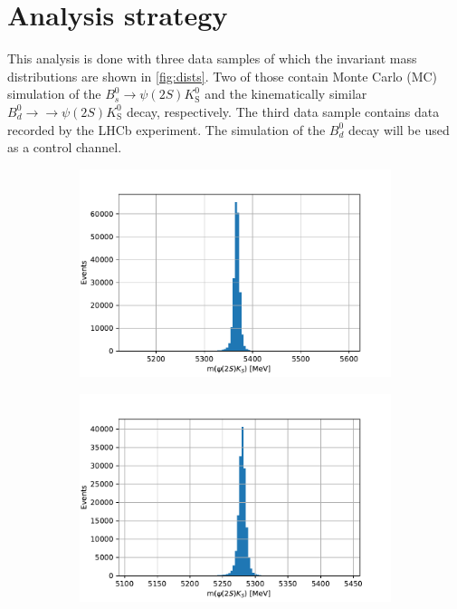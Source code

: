 \section{Analysis strategy}
\label{sec:Durchführung}
This analysis is done with three data samples of which the invariant mass distributions are shown in \autoref{fig:dists}. Two of those contain Monte Carlo (MC) simulation of the $B^0_s \to \psi(2S)K^0_\mathrm{S}$ and the kinematically similar $B^0_d \to \to \psi(2S)K^0_\mathrm{S}$ decay, respectively. The third data sample contains data recorded by the LHCb experiment. The simulation of the $B^0_d$ decay will be used as a control channel.

\begin{figure}[tb]
  \centering
  \begin{subfigure}{.32\textwidth}
    \includegraphics[width=\linewidth]{plots/sim_hist.pdf}
  \end{subfigure}
  \begin{subfigure}{.32\textwidth}
    \includegraphics[width=\linewidth]{plots/control_sim_hist.pdf}

\end{subfigure}
\end{figure}
